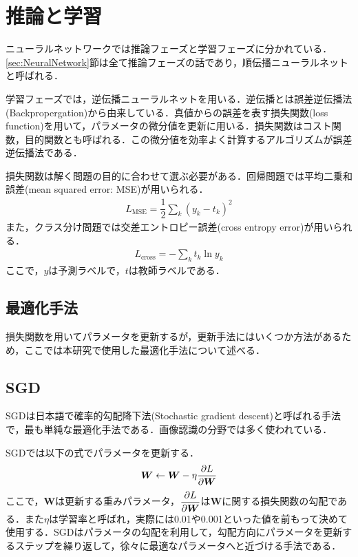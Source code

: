\section{推論と学習}
ニューラルネットワークでは推論フェーズと学習フェーズに分かれている．\ref{sec:NeuralNetwork}節は全て推論フェーズの話であり，順伝播ニューラルネットと呼ばれる．

学習フェーズでは，逆伝播ニューラルネットを用いる．逆伝播とは誤差逆伝播法(Backpropergation)\cite{Backprop}から由来している．真値からの誤差を表す損失関数(loss function)を用いて，パラメータの微分値を更新に用いる．損失関数はコスト関数，目的関数とも呼ばれる．この微分値を効率よく計算するアルゴリズムが誤差逆伝播法である．

損失関数は解く問題の目的に合わせて選ぶ必要がある．回帰問題では平均二乗和誤差(mean squared error: MSE)が用いられる．
\begin{align}\label{eq:mse}
	L_{\mathrm{MSE}} = \dfrac{1}{2} \sum_{k} (y_k - t_k)^2
\end{align}
また，クラス分け問題では交差エントロピー誤差(cross entropy error)が用いられる．
\begin{align}\label{eq:crossentropy}
	L_{\mathrm{cross}} = - \sum_k t_k \ln {y_k}
\end{align}
ここで，$y$は予測ラベルで，$t$は教師ラベルである．

\subsection{最適化手法}
損失関数を用いてパラメータを更新するが，更新手法にはいくつか方法があるため，ここでは本研究で使用した最適化手法について述べる．

\subsection*{SGD}
SGDは日本語で確率的勾配降下法(Stochastic gradient descent)と呼ばれる手法で，最も単純な最適化手法である．画像認識の分野では多く使われている．

SGDでは以下の式でパラメータを更新する．
\begin{align}\label{eq:SGD}
	\bm{W} \leftarrow \bm{W} - \eta \dfrac{\partial L}{\partial \bm{W}} 
\end{align}
ここで，$\bm{W}$は更新する重みパラメータ，$\dfrac{\partial L}{\partial \bm{W}}$は$\bm{W}$に関する損失関数の勾配である．また$\eta$は学習率と呼ばれ，実際には0.01や0.001といった値を前もって決めて使用する．SGDはパラメータの勾配を利用して，勾配方向にパラメータを更新するステップを繰り返して，徐々に最適なパラメータへと近づける手法である．

